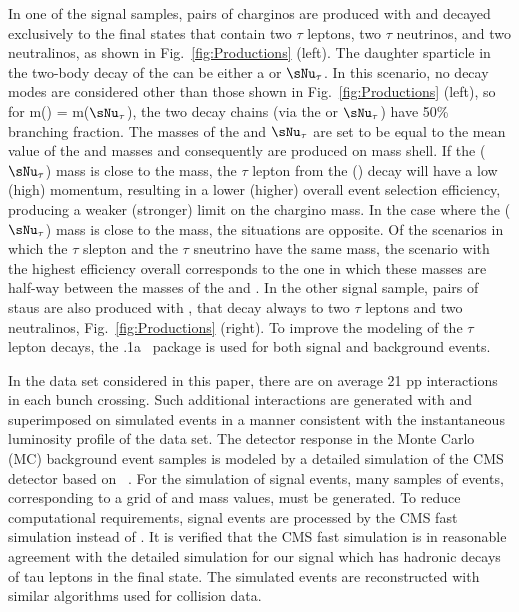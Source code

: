 In one of the signal samples, pairs of charginos are produced with  and decayed exclusively to the final states that contain 
two $\tau$ leptons, two $\tau$ neutrinos, and two neutralinos, as shown in Fig.~\ref{fig:Productions} (left). 
The daughter sparticle in the two-body decay of the \chione can be either a \sTau or $\sNu_{\tau}$. 
In this scenario, no decay modes are considered other than those shown in Fig.~\ref{fig:Productions} (left), so for m(\sTau) = m($\sNu_{\tau}$), the two decay chains 
(via the \sTau or $\sNu_{\tau}$) have 50\% branching fraction.
The masses of the \sTau and $\sNu_{\tau}$ are set to be equal to the mean value of the \chione and \PSGczDo masses and consequently are produced on mass shell.
If the \sTau ($\sNu_{\tau}$) mass is close to the \PSGczDo mass, the $\tau$ lepton from the \sTau (\chione) decay will 
have a low (high) momentum, resulting in a lower (higher) overall event selection efficiency, 
producing a weaker (stronger) limit on the chargino mass.
In the case where the \sTau ($\sNu_{\tau}$) mass is close to the \chione mass, the situations are opposite.
Of the scenarios in which the $\tau$ slepton and the $\tau$ sneutrino have the same mass, the scenario with the highest efficiency overall 
corresponds to the one in which these masses are half-way between the masses of the \chione and \PSGczDo.
In the other signal sample, pairs of staus are also produced with , 
that decay always to two $\tau$ leptons and two neutralinos, Fig.~\ref{fig:Productions} (right). 
To improve the modeling of the $\tau$ lepton decays, the .1a~\cite{Davidson:2010rw} package is used for both signal and background events. 

In the data set considered in this paper,
there are on average 21 pp interactions in each bunch crossing.
Such additional interactions are generated with \PYTHIA and superimposed on simulated events in a manner consistent with 
the instantaneous luminosity profile of the data set.
The detector response in the  Monte Carlo (MC) background event samples is modeled by a
detailed simulation
of the CMS detector based on {\GEANTfour}~\cite{Agostinelli:2002hh}.  
For the simulation of signal events, many samples of events, corresponding to a grid of \chione and \PSGczDo mass values, must be generated. 
To reduce  computational requirements, signal events are processed by the CMS fast simulation \cite{Abdullin:2011zz} instead of {\GEANTfour}. 
It is verified that the CMS fast simulation is in reasonable agreement with the detailed simulation for our signal which has hadronic decays of 
tau leptons in the final state.
The simulated events are reconstructed with similar algorithms used for collision data.

